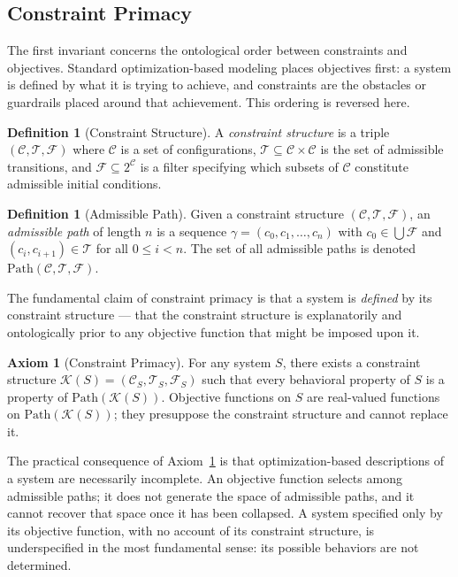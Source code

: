 \documentclass[12pt, twoside]{article}
\theoremstyle{plain}
\theoremstyle{definition}
\newtheorem{definition}[theorem]{Definition}
\newtheorem{axiom}[theorem]{Axiom}
\theoremstyle{remark}
\newcommand{\Cfg}{\mathcal{C}}
\newcommand{\Trans}{\mathcal{T}}
\begin{document}
\subsection{Constraint Primacy}

The first invariant concerns the ontological order between constraints
and objectives.
Standard optimization-based modeling places objectives first:
a system is defined by what it is trying to achieve,
and constraints are the obstacles or guardrails placed around that
achievement.
This ordering is reversed here.

\begin{definition}[Constraint Structure]
A \emph{constraint structure} is a triple $(\Cfg, \Trans, \mathcal{F})$
where $\Cfg$ is a set of configurations, $\Trans \subseteq \Cfg \times \Cfg$
is the set of admissible transitions, and $\mathcal{F} \subseteq 2^{\Cfg}$
is a filter specifying which subsets of $\Cfg$ constitute admissible
initial conditions.
\end{definition}

\begin{definition}[Admissible Path]
Given a constraint structure $(\Cfg, \Trans, \mathcal{F})$, an
\emph{admissible path} of length $n$ is a sequence
$\gamma = (c_0, c_1, \ldots, c_n)$ with $c_0 \in \bigcup \mathcal{F}$
and $(c_i, c_{i+1}) \in \Trans$ for all $0 \leq i < n$.
The set of all admissible paths is denoted $\mathrm{Path}(\Cfg, \Trans, \mathcal{F})$.
\end{definition}

The fundamental claim of constraint primacy is that a system is \emph{defined}
by its constraint structure — that the constraint structure is explanatorily
and ontologically prior to any objective function that might be imposed
upon it.

\begin{axiom}[Constraint Primacy]
\label{ax:constraint}
For any system $S$, there exists a constraint structure
$\mathcal{K}(S) = (\Cfg_S, \Trans_S, \mathcal{F}_S)$ such that every
behavioral property of $S$ is a property of
$\mathrm{Path}(\mathcal{K}(S))$.
Objective functions on $S$ are real-valued functions on
$\mathrm{Path}(\mathcal{K}(S))$; they presuppose the constraint
structure and cannot replace it.
\end{axiom}

The practical consequence of Axiom~\ref{ax:constraint} is that
optimization-based descriptions of a system are necessarily incomplete.
An objective function selects among admissible paths; it does not
generate the space of admissible paths, and it cannot recover
that space once it has been collapsed.
A system specified only by its objective function, with no account of
its constraint structure, is underspecified in the most fundamental sense:
its possible behaviors are not determined.
\end{document}
